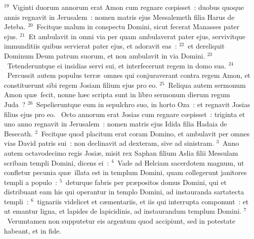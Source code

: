 ${}^{19}$~Viginti duorum annorum erat Amon cum regnare cœpisset~: duobus quoque annis regnavit in Jerusalem~: nomen matris ejus Messalemeth filia Harus de Jeteba.
${}^{20}$~Fecitque malum in conspectu Domini, sicut fecerat Manasses pater ejus.
${}^{21}$~Et ambulavit in omni via per quam ambulaverat pater ejus, servivitque immunditiis quibus servierat pater ejus, et adoravit eas~:
${}^{22}$~et dereliquit Dominum Deum patrum suorum, et non ambulavit in via Domini.
${}^{23}$~Tetenderuntque ei insidias servi sui, et interfecerunt regem in domo sua.
${}^{24}$~Percussit autem populus terr\ae\ omnes qui conjuraverant contra regem Amon, et constituerunt sibi regem Josiam filium ejus pro eo.
${}^{25}$~Reliqua autem sermonum Amon qu\ae\ fecit, nonne h\ae c scripta sunt in libro sermonum dierum regum Juda~?
${}^{26}$~Sepelieruntque eum in sepulchro suo, in horto Oza~: et regnavit Josias filius ejus pro eo.
~Octo annorum erat Josias cum regnare cœpisset~: triginta et uno anno regnavit in Jerusalem~: nomen matris ejus Idida filia Hadaia de Besecath.
${}^{2}$~Fecitque quod placitum erat coram Domino, et ambulavit per omnes vias David patris sui~: non declinavit ad dexteram, sive ad sinistram.
${}^{3}$~Anno autem octavodecimo regis Josi\ae , misit rex Saphan filium Aslia filii Messulam scribam templi Domini, dicens ei~:
${}^{4}$~Vade ad Helciam sacerdotem magnum, ut confletur pecunia qu\ae\ illata est in templum Domini, quam collegerunt janitores templi a populo~:
${}^{5}$~deturque fabris per pr\ae positos domus Domini, qui et distribuant eam his qui operantur in templo Domini, ad instauranda sartatecta templi~:
${}^{6}$~tignariis videlicet et c\ae mentariis, et iis qui interrupta componunt~: et ut emantur ligna, et lapides de lapicidinis, ad instaurandum templum Domini.
${}^{7}$~Verumtamen non supputetur eis argentum quod accipiunt, sed in potestate habeant, et in fide.


